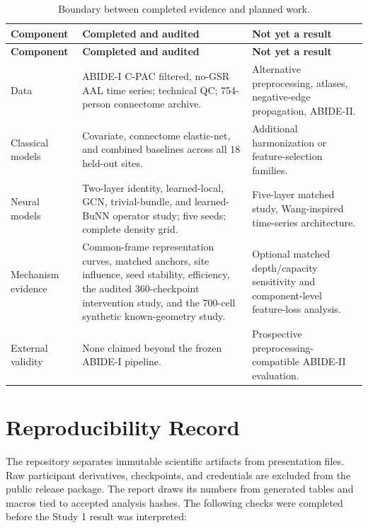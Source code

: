 \documentclass[11pt,a4paper]{article}
\begin{document}
\begin{longtable}{@{}p{3.2cm}p{5.6cm}p{5.5cm}@{}}
\caption{Boundary between completed evidence and planned work.}\label{tab:status}\\
\toprule
\textbf{Component} & \textbf{Completed and audited} & \textbf{Not yet a result} \\
\midrule
\endfirsthead
\toprule
\textbf{Component} & \textbf{Completed and audited} & \textbf{Not yet a result} \\
\midrule
\endhead
Data & ABIDE-I C-PAC filtered, no-GSR AAL time series; technical QC; 754-person connectome archive. & Alternative preprocessing, atlases, negative-edge propagation, ABIDE-II. \\
Classical models & Covariate, connectome elastic-net, and combined baselines across all 18 held-out sites. & Additional harmonization or feature-selection families. \\
Neural models & Two-layer identity, learned-local, GCN, trivial-bundle, and learned-BuNN operator study; five seeds; complete density grid. & Five-layer matched study, Wang-inspired time-series architecture. \\
Mechanism evidence & Common-frame representation curves, matched anchors, site influence, seed stability, efficiency, the audited 360-checkpoint intervention study, and the 700-cell synthetic known-geometry study. & Optional matched depth/capacity sensitivity and component-level feature-loss analysis. \\
External validity & None claimed beyond the frozen ABIDE-I pipeline. & Prospective preprocessing-compatible ABIDE-II evaluation. \\
\bottomrule
\end{longtable}

\clearpage
\appendix
\section{Reproducibility Record}

The repository separates immutable scientific artifacts from presentation
files. Raw participant derivatives, checkpoints, and credentials are excluded
from the public release package. The report draws its numbers from generated
tables and macros tied to accepted analysis hashes. The following checks were
completed before the Study 1 result was interpreted:
\end{document}
